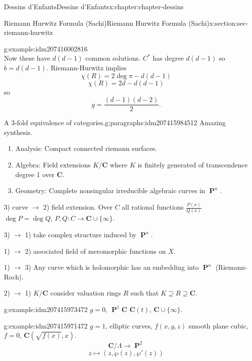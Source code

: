 \documentclass[oneside,10pt,]{book}
\numberwithin{equation}{section}
\newcommand{\CC}{\mathbf{C}}
\DeclareMathOperator{\PP}{\mathbf{P}}
\begin{document}
\begin{chapterptx}{Dessins d'Enfants}{}{Dessins d'Enfants}{}{}{x:chapter:chapter-dessins}
\begin{sectionptx}{Riemann Hurwitz Formula (Sachi)}{}{Riemann Hurwitz Formula (Sachi)}{}{}{x:section:sec-riemann-hurwitz}
\begin{example}{}{g:example:idm207416002816}
\begin{equation*}
\end{equation*}
Now these have \(d(d-1)\) common solutions. \(C^*\) has degree \(d(d-1)\) so \(b = d(d-1)\). Riemann-Hurwitz implies%
\begin{equation*}
\chi(R) = 2\deg \pi - d(d-1)
\end{equation*}
%
\begin{equation*}
\chi(R) = 2d - d(d-1)
\end{equation*}
so%
\begin{equation*}
g=  \frac{(d-1)(d-2)}{2}\text{.}
\end{equation*}
%
\end{example}
\begin{paragraphs}{A 3-fold equivalence of categories.}{g:paragraphs:idm207415984512}%
Amazing synthesis.%
\begin{enumerate}
\item{}Analysis: Compact connected riemann surfaces.%
\item{}Algebra: Field extensions \(K/\CC\) where \(K\) is finitely generated of transcendence degree 1 over \(\CC\).%
\item{}Geometry: Complete nonsingular irreducible algebraic curves in \(\PP^n\).%
\end{enumerate}
%
\par
3) curve \(\to\) 2) field extension. Over \(C\) all rational functions \(\frac{P(x)}{Q(x)}\) \(\deg P= \deg Q\), \(P,Q \colon C\to \CC \cup \{\infty\}\).%
\par
3) \(\to\) 1) take complex structure induced by \(\PP^n\).%
\par
1) \(\to\) 2) associated field of meromorphic functions on \(X\).%
\par
1) \(\to\) 3) Any curve which is holomorphic has an embedding into \(\PP^n\) (Riemann-Roch).%
\par
2) \(\to\) 1) \(K/\CC\) consider valuation rings \(R\) such that \(K\supseteq R\supseteq \CC\).%
\begin{example}{}{g:example:idm207415973472}%
\(g =0\), \(\PP^1 \CC\) \(\CC(t)\), \(\CC\cup \{\infty\}\).%
\end{example}
\begin{example}{}{g:example:idm207415971472}%
\(g =1\), elliptic curves, \(f(x,y,z)\) smooth plane cubic, \(f= 0\), \(\CC(\sqrt{f(x)}, x)\).%
\begin{equation*}
\CC/\Lambda \to \PP^2
\end{equation*}
%
\begin{equation*}
z\mapsto (z,\wp(z), \wp'(z))

\end{equation*}
\end{example}
\end{paragraphs}
\end{sectionptx}
\end{chapterptx}
\end{document}
